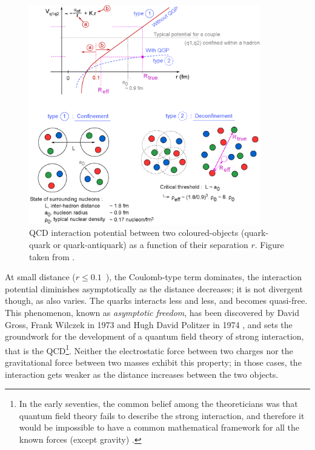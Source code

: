 \begin{figure}[t]
	\centering
	\includegraphics[width=0.9\textwidth]{Figs/Chapter2/GraphePotentiel.eps}
	\caption{QCD interaction potential between two coloured-objects (quark-quark or quark-antiquark) as a function of their separation $r$. Figure taken from \cite{maireProductionBaryonsMultietranges2011}.}
	\label{fig:QCDPotential}
\end{figure}

At small distance ($r \leq 0.1$~\fm), the Coulomb-type term dominates, the interaction potential diminishes asymptotically as the distance decreases; it is not divergent though, as \alphaS also varies. The quarks interacts less and less, and becomes quasi-free. This phenomenon, known as \textit{asymptotic freedom}, has been discovered by David Gross, Frank Wilczek in 1973 \cite{grossUltravioletBehaviorNonAbelian1973} and Hugh David Politzer in 1974 \cite{davidpolitzerAsymptoticFreedomApproach1974}, and sets the groundwork for the development of a quantum field theory of strong interaction, that is the QCD\footnote{In the early seventies, the common belief among the theoreticians was that quantum field theory fails to describe the strong interaction, and therefore it would be impossible to have a common mathematical framework for all the known forces (except gravity) \cite{s.glashowInteractionsJourneyMind1990}.}. Neither the electrostatic force between two charges nor the gravitational force between two masses exhibit this property; in those cases, the interaction gets weaker as the distance increases between the two objects.

